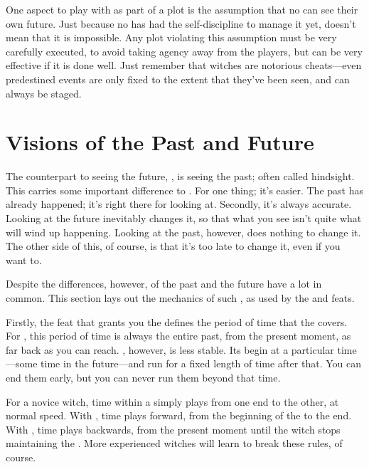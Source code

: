 One aspect to play with as part of a plot is the assumption that no  can see their own future.
Just because no  has had the self-discipline to manage it yet, doesn't mean that it is impossible.
Any plot violating this assumption must be very carefully executed, to avoid taking agency away from the players, but can be very effective if it is done well.
Just remember that witches are notorious cheats---even predestined events are only fixed to the extent that they've been seen, and can always be staged.

\section{Visions of the Past and Future}

The counterpart to seeing the future, {\foretelling}, is seeing the past; often called hindsight.
This carries some important difference to {\foretelling}.
For one thing; it's easier.
The past has already happened; it's right there for looking at.
Secondly, it's always accurate.
Looking at the future inevitably changes it, so that what you see isn't quite what will wind up happening.
Looking at the past, however, does nothing to change it.
The other side of this, of course, is that it's too late to change it, even if you want to.

Despite the differences, however, {\visions} of the past and the future have a lot in common.
This section lays out the mechanics of such {\visions}, as used by the  and  feats.

Firstly, the feat that grants you the {\vision} defines the period of time that the {\vision} covers.
For , this period of time is always the entire past, from the present moment, as far back as you can reach.
, however, is less stable.
Its {\visions} begin at a particular time---some time in the future---and run for a fixed length of time after that.
You can end them early, but you can never run them beyond that time.

For a novice witch, time within a {\vision} simply plays from one end to the other, at normal speed.
With , time plays forward, from the beginning of the {\vision} to the end.
With , time plays backwards, from the present moment until the witch stops maintaining the {\vision}.
More experienced witches will learn to break these rules, of course.

